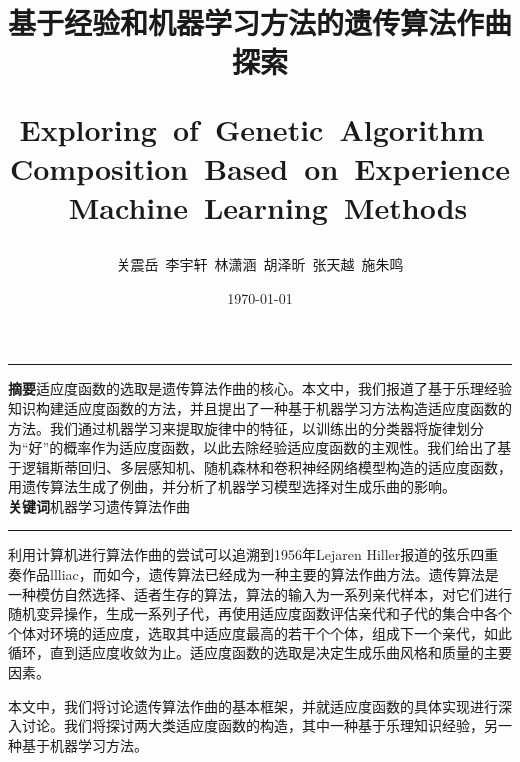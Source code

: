 \documentclass[UTF8,a4paper,10pt]{ctexart}
\title{\textcolor[rgb]{0,0.3,0.6}{\textbf{基于经验和机器学习方法的遗传算法作曲探索 }\\ [2ex] \begin{large} Exploring\  of\  Genetic\  Algorithm\  Composition\  Based\  on\  Experience\ Machine\  Learning\ Methods\end{large}}}
\author{关震岳\  李宇轩\  林潇涵\  胡泽昕\  张天越\  施朱鸣}
\date{\today}
\begin{document}
    \maketitle


    \noindent \rule{\textwidth}{.625mm}
    \textbf{摘要}\quad 适应度函数的选取是遗传算法作曲的核心。本文中，我们报道了基于乐理经验知识构建适应度函数的方法，并且提出了一种基于机器学习方法构造适应度函数的方法。我们通过机器学习来提取旋律中的特征，以训练出的分类器将旋律划分为“好”的概率作为适应度函数，以此去除经验适应度函数的主观性。我们给出了基于逻辑斯蒂回归、多层感知机、随机森林和卷积神经网络模型构造的适应度函数，用遗传算法生成了例曲，并分析了机器学习模型选择对生成乐曲的影响。\\
    \textbf{关键词}\quad 机器学习\quad 遗传算法\quad 作曲\\
    \rule{\textwidth}{.625mm}
    \vspace*{.5cm}

    利用计算机进行算法作曲的尝试可以追溯到1956年Lejaren Hiller报道的弦乐四重奏作品llliac，而如今，遗传算法已经成为一种主要的算法作曲方法。遗传算法是一种模仿自然选择、适者生存的算法，算法的输入为一系列亲代样本，对它们进行随机变异操作，生成一系列子代，再使用适应度函数评估亲代和子代的集合中各个个体对环境的适应度，选取其中适应度最高的若干个个体，组成下一个亲代，如此循环，直到适应度收敛为止。适应度函数的选取是决定生成乐曲风格和质量的主要因素。\par
    本文中，我们将讨论遗传算法作曲的基本框架，并就适应度函数的具体实现进行深入讨论。我们将探讨两大类适应度函数的构造，其中一种基于乐理知识经验，另一种基于机器学习方法。
\end{document}
